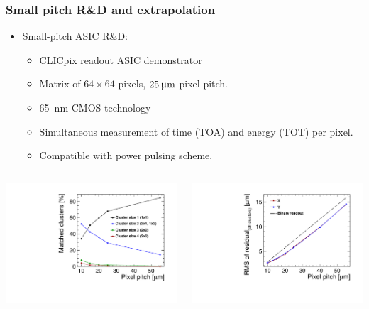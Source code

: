 \begin{frame}
  \frametitle{Small pitch R\&D and extrapolation}


  \begin{itemize}
  \item Small-pitch ASIC R\&D:
    \begin{itemize}
    \item CLICpix readout ASIC demonstrator
    \item Matrix of $64\times64$ pixels, $25\,\upmu\mathrm{m}$ pixel pitch.
    \item 65~nm CMOS technology
    \item Simultaneous measurement of time (TOA) and energy (TOT) per
      pixel.
    \item Compatible with power pulsing scheme.
    \end{itemize}
  \end{itemize}

  \begin{columns}
    \centering
    \includegraphics[width=\textwidth]{../figures/TestBeam/ClusterSize_extrapolationSmallerPixels.pdf}

    \centering
    \includegraphics[width=\textwidth]{../figures/TestBeam/RMS_extrapolationSmallerPixels.pdf}
  \end{columns}

\end{frame}


